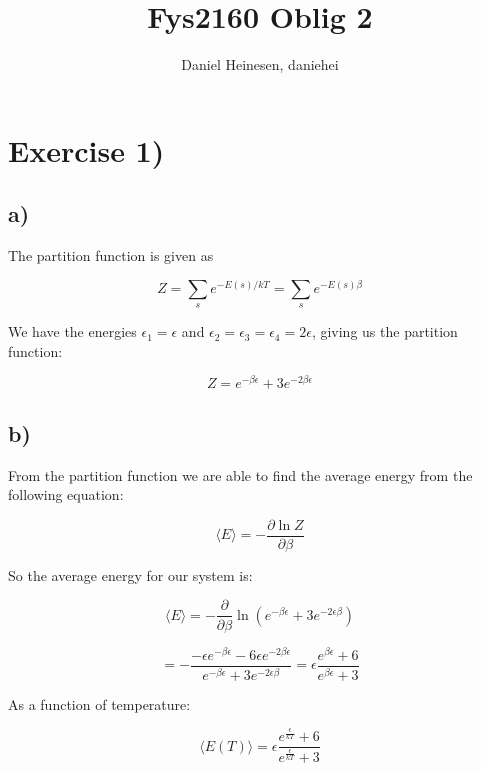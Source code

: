 \documentclass[a4paper,norsk, 10pt]{article}
\title{Fys2160 Oblig 2}
\author{Daniel Heinesen, daniehei}
\newcommand{\pd}[2]{\frac{\partial #1}{\partial #2}}
\begin{document}
\maketitle

\section{Exercise 1)}

\subsection{a)}
The partition function is given as

\begin{equation}
Z = \sum_s e^{-E(s)/kT} = \sum_s e^{-E(s)\beta}
\end{equation}\label{eq:partition}

We have the energies $\epsilon_1 = \epsilon$ and $\epsilon_2 = \epsilon_3 = \epsilon_4 = 2\epsilon$, giving us the partition function:

\begin{equation}
Z = e^{-\beta \epsilon} + 3e^{-2\beta \epsilon}
\end{equation}

\subsection{b)}
From the partition function we are able to find the average energy from the following equation:

\begin{equation}
\langle E \rangle = - \pd{\ln Z}{\beta}
\end{equation}\label{eq:magic}

So the average energy for our system is:

\begin{equation}
\langle E \rangle = -\pd{}{\beta} \ln \left(e^{-\beta\epsilon} +3e^{-2\epsilon\beta}\right)
\end{equation}

\begin{equation}
= -\frac{-\epsilon e^{-\beta\epsilon} - 6\epsilon e^{-2\beta\epsilon}}{e^{-\beta\epsilon} +3e^{-2\epsilon\beta}}
= \epsilon\frac{e^{\beta\epsilon} + 6}{e^{\beta\epsilon} +3}
\end{equation}

As a function of temperature:

\begin{equation}
\langle E(T) \rangle = \epsilon\frac{e^{\frac{\epsilon}{kT}} + 6}{e^{\frac{\epsilon}{kT}} +3}
\end{equation}\label{eq:energyDiatomic}
\end{document}
